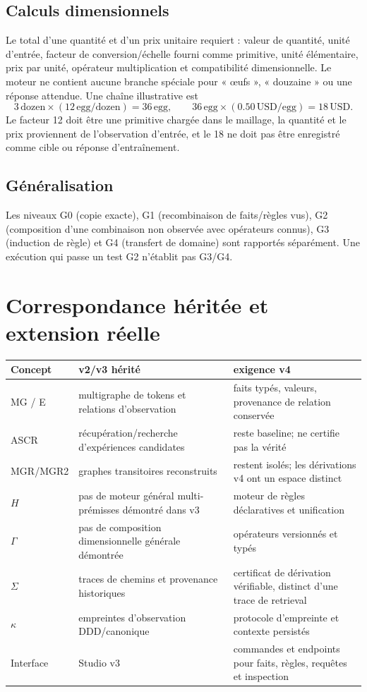 \documentclass[11pt,a4paper]{book}
\begin{document}
\section{Calculs dimensionnels}
Le total d'une quantité et d'un prix unitaire requiert : valeur de quantité, unité d'entrée, facteur de conversion/échelle fourni comme primitive, unité élémentaire, prix par unité, opérateur multiplication et compatibilité dimensionnelle. Le moteur ne contient aucune branche spéciale pour « œufs », « douzaine » ou une réponse attendue. Une chaîne illustrative est
\[
3\,\mathrm{dozen}\times(12\,\mathrm{egg}/\mathrm{dozen})=36\,\mathrm{egg},\qquad
36\,\mathrm{egg}\times(0.50\,\mathrm{USD}/\mathrm{egg})=18\,\mathrm{USD}.
\]
Le facteur 12 doit être une primitive chargée dans le maillage, la quantité et le prix proviennent de l'observation d'entrée, et le 18 ne doit pas être enregistré comme cible ou réponse d'entraînement.
\section{Généralisation}
Les niveaux G0 (copie exacte), G1 (recombinaison de faits/règles vus), G2 (composition d'une combinaison non observée avec opérateurs connus), G3 (induction de règle) et G4 (transfert de domaine) sont rapportés séparément. Une exécution qui passe un test G2 n'établit pas G3/G4.

\chapter{Correspondance héritée et extension réelle}
\begin{longtable}{p{}p{}p{}}
\textbf{Concept} & \textbf{v2/v3 hérité} & \textbf{exigence v4}\tabularnewline\hline
MG / E & multigraphe de tokens et relations d'observation & faits typés, valeurs, provenance de relation conservée\tabularnewline
ASCR & récupération/recherche d'expériences candidates & reste baseline; ne certifie pas la vérité\tabularnewline
MGR/MGR2 & graphes transitoires reconstruits & restent isolés; les dérivations v4 ont un espace distinct\tabularnewline
$H$ & pas de moteur général multi-prémisses démontré dans v3 & moteur de règles déclaratives et unification\tabularnewline
$\Gamma$ & pas de composition dimensionnelle générale démontrée & opérateurs versionnés et typés\tabularnewline
$\Sigma$ & traces de chemins et provenance historiques & certificat de dérivation vérifiable, distinct d'une trace de retrieval\tabularnewline
$\kappa$ & empreintes d'observation DDD/canonique & protocole d'empreinte et contexte persistés\tabularnewline
Interface & Studio v3 & commandes et endpoints pour faits, règles, requêtes et inspection\tabularnewline
\end{longtable}
\end{document}
